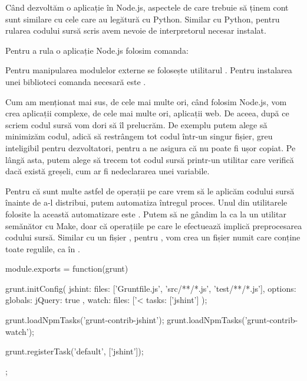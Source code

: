 Când dezvoltăm o aplicație în Node.js, aspectele de care trebuie să ținem cont
sunt similare cu cele care au legătură cu Python. Similar cu Python, pentru
rularea codului sursă scris avem nevoie de interpretorul necesar instalat.

Pentru a rula o aplicație Node.js folosim comanda:


Pentru manipularea modulelor externe se folosește utilitarul . Pentru
instalarea unei biblioteci comanda necesară este .

Cum am menționat mai sus, de cele mai multe ori, când folosim Node.js, vom crea
aplicații complexe, de cele mai multe ori, aplicații web. De aceea, după ce
scriem codul sursă vom dori să îl prelucrăm. De exemplu putem alege să minimizăm
codul, adică să restrângem tot codul într-un singur fișier, greu inteligibil
pentru dezvoltatori, pentru a ne asigura că nu poate fi ușor copiat. Pe lângă
asta, putem alege să trecem tot codul sursă printr-un utilitar care verifică
dacă există greșeli, cum ar fi nedeclararea unei variabile.

Pentru că sunt multe astfel de operații pe care vrem să le aplicăm codului sursă
înainte de a-l distribui, putem automatiza întregul proces. Unul din utilitarele
folosite la această automatizare este . Putem să ne gândim la 
ca la un utilitar semănător cu Make, doar că operațiile pe care  le
efectuează implică preprocesarea codului sursă. Similar cu un fișier , pentru
, vom crea un fișier numit  care conține toate regulile, ca în .

\begin{screen}[caption={Exemplu cod Gruntfile},label={lst:appdev:gruntfile}]
module.exports = function(grunt) {

 grunt.initConfig({
   jshint: {
     files: ['Gruntfile.js', 'src/**/*.js', 'test/**/*.js'],
     options: {
       globals: {
         jQuery: true
       }
     }
   },
   watch: {
     files: ['<%
     tasks: ['jshint']
   }
 });

 grunt.loadNpmTasks('grunt-contrib-jshint');
 grunt.loadNpmTasks('grunt-contrib-watch');

 grunt.registerTask('default', ['jshint']);

};
\end{screen}

